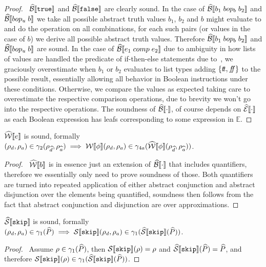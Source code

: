 \begin{proof}
    \pfsketch\
    $\widehat{\mathcal{B}}\llbracket \texttt{true} \rrbracket$ and $\widehat{\mathcal{B}}\llbracket \texttt{false} \rrbracket$ are clearly sound.
    In the case of $\widehat{\mathcal{B}}\llbracket b_1 \; bop_b \; b_2 \rrbracket$ and $\widehat{\mathcal{B}}\llbracket bop_u \; b \rrbracket$ we take all possible abstract truth values $b_1$, $b_2$ and $b$ might evaluate to and do the operation on all combinations, for each such pairs (or values in the case of $b$) we derive all possible abstract truth values.
    Therefore $\widehat{\mathcal{B}}\llbracket b_1 \; bop_b \; b_2 \rrbracket$ and $\widehat{\mathcal{B}}\llbracket bop_u \; b \rrbracket$ are sound.
    In the case of $\widehat{\mathcal{B}}\llbracket e_1 \; comp \; e_2 \rrbracket$ due to ambiguity in how lists of values are handled the predicate of if-then-else statements due to~\cite{halder_abstract_2012}, we graciously overestimate when $b_1$ or $b_2$ evaluates to list types adding $\{t\!t, f\!\!f\}$ to the possible result, essentially allowing all behavior in Boolean instructions under these conditions.
    Otherwise, we compare the values as expected taking care to overestimate the respective comparison operations, due to brevity we won't go into the respective operations.
    The soundness of $\widehat{\mathcal{B}}\llbracket \cdot \rrbracket$, of course depends on $\widehat{\mathcal{E}}\llbracket \cdot \rrbracket$ as each Boolean expression has leafs corresponding to some expression in $\mathbb{E}$.
\end{proof}


\begin{conjecture}\label{thm:sound-bexp}
    $\widehat{\mathcal{W}}\llbracket e \rrbracket$ is sound, formally $(\rho_d, \rho_a) \in \gamma_2(\rho_{\widehat{d}}, \rho_{\widehat{a}}) \implies \mathcal{W}\llbracket \phi \rrbracket(\rho_d, \rho_a) \in \gamma_{4a}(\widehat{\mathcal{W}}\llbracket \phi \rrbracket(\rho_{\widehat{d}}, \rho_{\widehat{a}}))$.
\end{conjecture}


\begin{proof}
    \pfsketch\
    $\widehat{\mathcal{W}}\llbracket b \rrbracket$ is in essence just an extension of $\widehat{\mathcal{B}}\llbracket \cdot \rrbracket$ that includes quantifiers, therefore we essentially only need to prove soundness of those.
    Both quantifiers are turned into repeated application of either abstract conjunction and abstract disjunction over the elements being quantified, soundness then follows from the fact that abstract conjunction and disjunction are over approximations.
\end{proof}


\begin{conjecture}\label{thm:sound-skip}
    $\widehat{\mathcal{S}} \llbracket \texttt{skip} \rrbracket$ is sound, formally $(\rho_d, \rho_a) \in \gamma_1(\widehat{P}) \implies \mathcal{S} \llbracket \texttt{skip} \rrbracket(\rho_d, \rho_a) \in \gamma_1(\widehat{\mathcal{S}} \llbracket \texttt{skip} \rrbracket(\widehat{P}))$.
\end{conjecture}
\begin{proof}
    \pf\ Assume $\rho \in \gamma_1(\widehat{P})$, then $\mathcal{S} \llbracket \texttt{skip} \rrbracket(\rho) = \rho$ and $\widehat{\mathcal{S}} \llbracket \texttt{skip} \rrbracket(\widehat{P}) = \widehat{P}$, and therefore $\mathcal{S} \llbracket \texttt{skip} \rrbracket(\rho) \in \gamma_1(\widehat{\mathcal{S}} \llbracket \texttt{skip} \rrbracket(\widehat{P}))$.
\end{proof}



